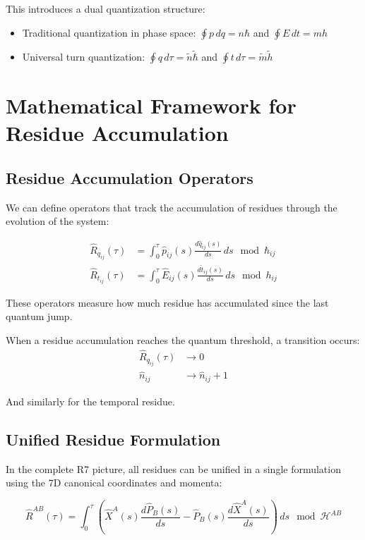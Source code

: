 \documentclass{article}
\begin{document}
This introduces a dual quantization structure:
\begin{itemize}
\item Traditional quantization in phase space: $\oint p \, dq = n\hbar$ and $\oint E \, dt = mh$
\item Universal turn quantization: $\oint q \, d\tau = \tilde{n}\tilde{\hbar}$ and $\oint t \, d\tau = \tilde{m}\tilde{h}$
\end{itemize}

\section{Mathematical Framework for Residue Accumulation}

\subsection{Residue Accumulation Operators}

We can define operators that track the accumulation of residues through the evolution of the system:

\begin{align}
\hat{R}_{q_{ij}}(\tau) &= \int_0^\tau \hat{p}_{ij}(s) \frac{d\hat{q}_{ij}(s)}{ds} \, ds \mod \hbar_{ij} \\
\hat{R}_{t_{ij}}(\tau) &= \int_0^\tau \hat{E}_{ij}(s) \frac{d\hat{t}_{ij}(s)}{ds} \, ds \mod h_{ij}
\end{align}

These operators measure how much residue has accumulated since the last quantum jump.

When a residue accumulation reaches the quantum threshold, a transition occurs:
\begin{align}
\hat{R}_{q_{ij}}(\tau) &\to 0 \\
\hat{n}_{ij} &\to \hat{n}_{ij} + 1
\end{align}

And similarly for the temporal residue.

\subsection{Unified Residue Formulation}

In the complete R7 picture, all residues can be unified in a single formulation using the 7D canonical coordinates and momenta:

\begin{equation}
\hat{R}^{AB}(\tau) = \int_0^\tau \left(\hat{X}^A(s) \frac{d\hat{P}_B(s)}{ds} - \hat{P}_B(s) \frac{d\hat{X}^A(s)}{ds}\right) \, ds \mod \mathcal{H}^{AB}
\end{equation}
\end{document}
